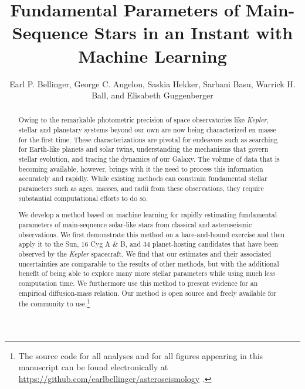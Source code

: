 \documentclass[manuscript,linenumbers]{aastex6}
\newif\ifref
\newcommand{\mb}[1]{\ifref\boldmath\textbf{#1}\unboldmath\else #1\fi}
\begin{document}
\title{Fundamental Parameters of Main-Sequence Stars in an Instant with Machine Learning}

\author{Earl P. Bellinger, George C. Angelou, Saskia Hekker, Sarbani Basu, Warrick H. Ball, and Elisabeth Guggenberger}

\begin{abstract}
Owing to the remarkable photometric precision of space observatories like \emph{Kepler}, stellar and planetary systems beyond our own are now being characterized en masse for the first time. These characterizations are pivotal for endeavors such as searching for Earth-like planets and solar twins, understanding the mechanisms that govern stellar evolution, and tracing the dynamics of our Galaxy. The volume of data that is becoming available, however, brings with it the need to process this information accurately and rapidly. While existing methods can constrain \mb{fundamental stellar parameters such as ages, masses, and radii} from these observations, they require substantial computational efforts to do so. 

We develop a method based on machine learning for rapidly estimating fundamental parameters of main-sequence solar-like stars from classical and asteroseismic observations. We first demonstrate this method on a hare-and-hound exercise and then apply it to the Sun, 16 Cyg A \& B, and 34 planet-hosting candidates that have been observed by the \emph{Kepler} spacecraft. We find that our estimates and their associated uncertainties are comparable to the results of other methods, but with the additional benefit of being able to explore many more stellar parameters while using much less computation time. We furthermore use this method to present evidence for an empirical diffusion-mass relation. Our method is open source and freely available for the community to use.\footnote{The source code for all analyses and for all figures appearing in this manuscript can be found electronically at \url{https://github.com/earlbellinger/asteroseismology} \citep{earl_bellinger_2016_55400}.}
\end{abstract}
\end{document}
